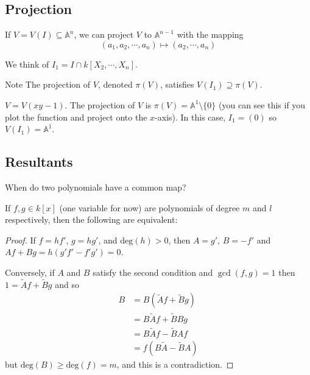 \documentclass[a4paper,twoside,master.tex]{subfiles}
\begin{document}
\subsection{Projection}\label{sub:projection}

If $ V = V(I) \subseteq \mathbb{A}^n $, we can project $ V $ to $ \mathbb{A}^{n-1} $ with the mapping
\begin{equation}
    (a_1, a_2, \cdots, a_n) \mapsto (a_2, \cdots, a_n)
\end{equation}

We think of $ I_1 = I \cap k[X_2, \cdots, X_n] $.
\begin{note}{Note}
    The projection of $ V $, denoted $ \pi(V) $, satisfies $ V(I_1) \supseteq \pi(V) $.
\end{note}

\begin{ex}
    $ V = V(xy-1) $. The projection of $ V $ is $ \pi(V) = \mathbb{A}^1 \setminus \{0\} $ (you can see this if you plot the function and project onto the $ x $-axis). In this case, $ I_1 = (0) $ so $ V(I_1) = \mathbb{A}^1 $.
\end{ex}

\subsection{Resultants}\label{sub:resultants}

When do two polynomials have a common map?
\begin{claim}
    If $ f, g \in k[x] $ (one variable for now) are polynomials of degree $ m $ and $ l $ respectively, then the following are equivalent:
\end{claim}
\begin{proof}
    If $ f = hf' $, $ g = hg' $, and $ \text{deg}(h) > 0 $, then $ A = g' $, $ B = -f' $ and $ Af + Bg = h(g'f' - f'g') = 0 $.

    Conversely, if $ A $ and $ B $ satisfy the second condition and $ \gcd(f, g) = 1 $ then $ 1 = \tilde{A} f + \tilde{B} g $ and so
    \begin{align}
        B &= B(\tilde{A} f + \tilde{B} g) \\
          &= B \tilde{A} f + \tilde{B} B g \\
          &= B \tilde{A} f - \tilde{B} A f \\
          &= f(B \tilde{A} - \tilde{B} A)
    \end{align}
    but $ \text{deg}(B) \geq \text{deg}(f) = m $, and this is a contradiction.
\end{proof}
\end{document}
